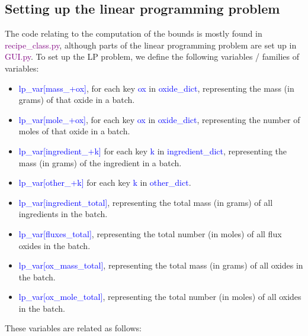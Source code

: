 \documentclass[a4paper,10pt]{article}
\def\'{\textquotesingle}
\def\blue{\textcolor{blue}}
\def\green{\textcolor{Purple}}
\def\lpv{lp\_var}
\begin{document}
\subsection{Setting up the linear programming problem}
The code relating to the computation of the bounds is mostly found in \newline
\green{recipe\_class.py}, although parts of the linear programming problem are set up in \green{GUI.py}. To set up the LP problem, we define the following variables / families of variables:
\begin{itemize}
\item \blue{\lpv[\'mass\_\'+ox]}, for each key \blue{ox} in \blue{oxide\_dict}, representing the mass (in grams) of that oxide in a batch.
\item \blue{\lpv[\'mole\_\'+ox]}, for each key \blue{ox} in \blue{oxide\_dict}, representing the number of moles of that oxide in a batch.
\item \blue{\lpv[\'ingredient\_\'+k]} for each key \blue{k} in \blue{ingredient\_dict}, representing the mass (in grams) of the ingredient in a batch.
\item \blue{\lpv[\'other\_\'+k]} for each key \blue{k} in \blue{other\_dict}. 
\item \blue{\lpv[\'ingredient\_total\']}, representing the total mass (in grams) of all ingredients in the batch.
\item \blue{\lpv[\'fluxes\_total\']}, representing the total number (in moles) of all flux oxides in the batch.
\item \blue{\lpv[\'ox\_mass\_total\']}, representing the total mass (in grams) of all oxides in the batch.
\item \blue{\lpv[\'ox\_mole\_total\']}, representing the total number (in moles) of all oxides in the batch.
\end{itemize}
%
These variables are related as follows:
%
\end{document}
